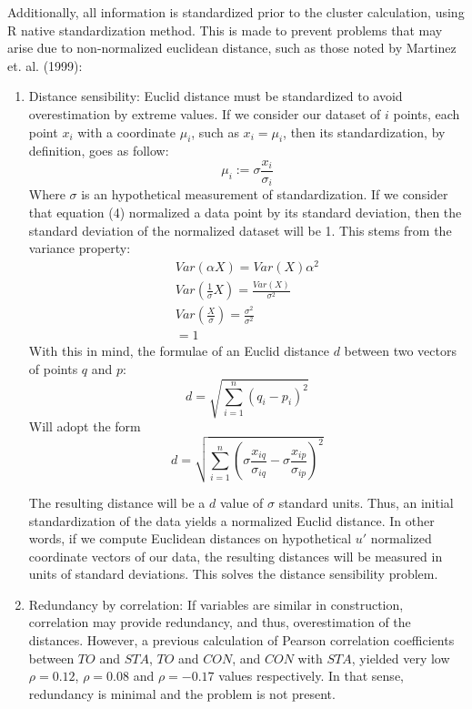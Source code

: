 \documentclass[12pt,a4paper]{article}
\begin{document}
Additionally, all information is standardized prior to the cluster calculation, using R native standardization method. This is made to prevent problems that may arise due to non-normalized euclidean distance, such as those noted by Martinez et. al. (1999):
\begin{enumerate}
	\item Distance sensibility: Euclid distance must be standardized to avoid overestimation by extreme values. If we consider our dataset of $i$ points, each point $x_{i}$ with a coordinate $\mu_{i}$, such as $x_{i} = \mu_{i}$, then its standardization, by definition, goes as follow:
	\begin{equation}
		\mu_{i} := \sigma \frac{x_{i}}{\sigma_{i}}
	\end{equation}
	Where $\sigma$ is an hypothetical measurement of standardization. If we consider that equation (4) normalized a data point by its standard deviation, then the standard deviation of the normalized dataset will be 1. This stems from the variance property:
	\begin{equation}
	\begin{split}
		Var(\alpha X) = Var(X)\alpha^2 \\
		Var(\frac{1}{\sigma} X) = \frac{Var(X)}{\sigma^2} \\
	    Var(\frac{X}{\sigma}) = \frac{\sigma^2}{\sigma^2} \\
	    = 1
	\end{split}
	\end{equation}
	With this in mind, the formulae of an Euclid distance $d$ between two vectors of points $q$ and $p$:
	\begin{equation}
		d = \sqrt{\sum_{i = 1}^{n}(q_{i}-p_{i})^2}
	\end{equation}
	Will adopt the form
	\begin{equation}
		d = \sqrt{\sum_{i = 1}^{n}(\sigma \frac{x_{iq}}{\sigma_{iq}} - \sigma \frac{x_{ip}}{\sigma_{ip} })^2}
	\end{equation}

	The resulting distance will be a $d$ value of $\sigma$ standard units. Thus, an initial standardization of the data yields a normalized Euclid distance. In other words, if we compute Euclidean distances on hypothetical $u'$ normalized coordinate vectors of our data, the resulting distances will be measured in units of standard deviations. This solves the distance sensibility problem.
	
	\item Redundancy by correlation: If variables are similar in construction, correlation may provide redundancy, and thus, overestimation of the distances. However, a previous calculation of Pearson correlation coefficients between $TO$ and $STA$, $TO$ and $CON$, and $CON$ with $STA$, yielded very low $\rho = 0.12$, $\rho = 0.08$ and $\rho = -0.17$ values respectively. In that sense, redundancy is minimal and the problem is not present.
\end{enumerate}
\end{document}
